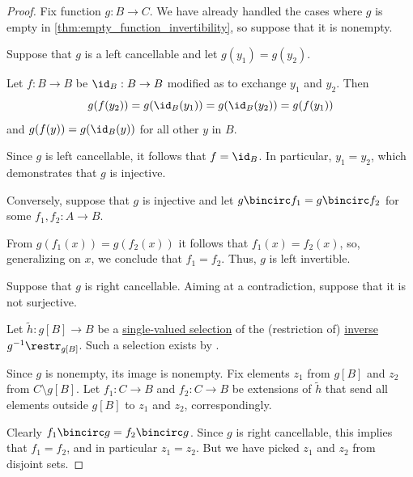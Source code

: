 \begin{proof}
  Fix function \( g: B \to C \). We have already handled the cases where \( g \) is empty in \cref{thm:empty_function_invertibility}, so suppose that it is nonempty.


  \SufficiencySubProof* Suppose that \( g \) is a left cancellable and let \( g(y_1) = g(y_2) \).

  Let \( f: B \to B \) be \( \id_B: B \to B \) modified as to exchange \( y_1 \) and \( y_2 \). Then
  \begin{equation*}
    g(f(y_2)) = g(\id_B(y_1)) = g(\id_B(y_2)) = g(f(y_1))
  \end{equation*}
  and \( g(f(y)) = g(\id_B(y)) \) for all other \( y \) in \( B \).

  Since \( g \) is left cancellable, it follows that \( f = \id_B \). In particular, \( y_1 = y_2 \), which demonstrates that \( g \) is injective.

  \NecessitySubProof* Conversely, suppose that \( g \) is injective and let \( g \bincirc f_1 = g \bincirc f_2 \) for some \( f_1, f_2: A \to B \).

  From \( g(f_1(x)) = g(f_2(x)) \) it follows that \( f_1(x) = f_2(x) \), so, generalizing on \( x \), we conclude that \( f_1 = f_2 \). Thus, \( g \) is left invertible.


  \SufficiencySubProof* Suppose that \( g \) is right cancellable. Aiming at a contradiction, suppose that it is not surjective.

  Let \( \widetilde h: g[B] \to B \) be a \hyperref[def:set_valued_selection]{single-valued selection} of the (restriction of) \hyperref[def:set_valued_function/inverse]{inverse} \( g^{-1}\restr_{g[B]} \). Such a selection exists by .

  Since \( g \) is nonempty, its image is nonempty. Fix elements \( z_1 \) from \( g[B] \) and \( z_2 \) from \( C \setminus g[B] \). Let \( f_1: C \to B \) and \( f_2: C \to B \) be extensions of \( \widetilde h \) that send all elements outside \( g[B] \) to \( z_1 \) and \( z_2 \), correspondingly.

  Clearly \( f_1 \bincirc g = f_2 \bincirc g \). Since \( g \) is right cancellable, this implies that \( f_1 = f_2 \), and in particular \( z_1 = z_2 \). But we have picked \( z_1 \) and \( z_2 \) from disjoint sets.


\end{proof}
